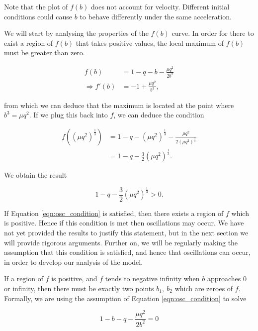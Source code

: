 \documentclass{article}
\begin{document}
Note that the plot of $f(b)$ does not account for velocity.
Different initial conditions could cause $b$ to behave differently under the same acceleration.

We will start by analysing the properties of the $f(b)$ curve.
In order for there to exist a region of $f(b)$ that takes positive values,
the local maximum of $f(b)$ must be greater than zero.

\begin{align}
    f(b)              & = 1 - q - b - \frac{\mu q^2}{2b^2} \\
    \Rightarrow f'(b) & = -1 + \frac{\mu q^2}{b^3},
\end{align}

from which we can deduce that the maximum is located at the point where $b^3 = \mu q^2$.
If we plug this back into $f$, we can deduce the condition

\begin{align}
    f((\mu q^2)^{\frac{1}{3}}) & = 1 - q - (\mu q^2)^{\frac{1}{3}} - \frac{\mu q^2}{2(\mu q^2)^{\frac{2}{3}}} \\
                               & = 1 - q - \frac{3}{2}(\mu q^2)^{\frac{1}{3}}.
\end{align}

We obtain the result

\begin{equation}
    1 - q - \frac{3}{2}(\mu q^2)^{\frac{1}{3}} > 0.
    \label{eqn:osc_condition}
\end{equation}

If Equation \ref{eqn:osc_condition} is satisfied,
then there exists a region of $f$ which is positive.
Hence if this condition is met then oscillations may occur. %
We have not yet provided the results to justify this statement, but in the next section we will provide rigorous arguments. %
Further on, we will be regularly making the assumption that this condition is satisfied,
and hence that oscillations can occur,
in order to develop our analysis of the model.

If a region of $f$ is positive, and $f$ tends to negative infinity when $b$ approaches $0$ or infinity,
then there must be exactly two points $b_1,~b_2$ which are zeroes of $f$.
Formally, we are using the assumption of Equation \ref{eqn:osc_condition} to solve

\begin{equation}
    1 - b - q - \frac{\mu q^2}{2b^2} = 0
\end{equation}
\end{document}
